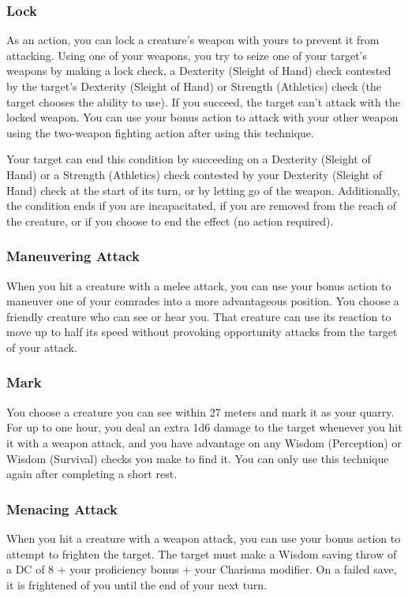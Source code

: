 \subsubsection{Lock} \label{tec::lock}
As an action, you can lock a creature's weapon with yours to prevent it from attacking.
Using one of your weapons, you try to seize one of your target's weapons by making a lock check, a Dexterity (Sleight of Hand) check contested by the target's Dexterity (Sleight of Hand) or Strength (Athletics) check (the target chooses the ability to use).
If you succeed, the target can't attack with the locked weapon.
You can use your bonus action to attack with your other weapon using the two-weapon fighting action after using this technique.

Your target can end this condition by succeeding on a Dexterity (Sleight of Hand) or a Strength (Athletics) check contested by your Dexterity (Sleight of Hand) check at the start of its turn, or by letting go of the weapon.
Additionally, the condition ends if you are incapacitated, if you are removed from the reach of the creature, or if you choose to end the effect (no action required).

\subsubsection{Maneuvering Attack} \label{tec::maneuveringattack}
When you hit a creature with a melee attack, you can use your bonus action to maneuver one of your comrades into a more advantageous position.
You choose a friendly creature who can see or hear you.
That creature can use its reaction to move up to half its speed without provoking opportunity attacks from the target of your attack.

\subsubsection{Mark} \label{tec::mark}
You choose a creature you can see within 27 meters and mark it as your quarry.
For up to one hour, you deal an extra 1d6 damage to the target whenever you hit it with a weapon attack, and you have advantage on any Wisdom (Perception) or Wisdom (Survival) checks you make to find it.
You can only use this technique again after completing a short rest.

\subsubsection{Menacing Attack} \label{tec::menacingattack}
When you hit a creature with a weapon attack, you can use your bonus action to attempt to frighten the target.
The target must make a Wisdom saving throw of a DC of 8 + your proficiency bonus + your Charisma modifier.
On a failed save, it is frightened of you until the end of your next turn.

